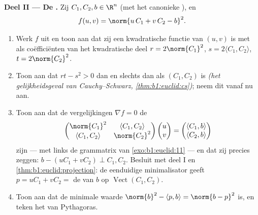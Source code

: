 \begin{problem}
\medskip
\noindent\textbf{Deel II --- De .} Zij $C_1,
C_2, b \in \R^n$ (met het canonieke ), en
\[
f(u, v) = \norm{u\,C_1 + v\,C_2 - b}^2 .
\]
\begin{enumerate}[resume]
  \item Werk $f$ uit en toon aan dat zij een kwadratische functie
        van $(u, v)$ is met als coëfficiënten van het kwadratische
        deel $r = 2\norm{C_1}^2$, $s = 2\langle C_1, C_2\rangle$,
        $t = 2\norm{C_2}^2$.
  \item Toon aan dat $rt - s^2 > 0$ dan en slechts dan als $(C_1,
        C_2)$  is \emph{(het gelijkheidsgeval van
        Cauchy--Schwarz, \cref{thm:b1:euclid:cs})}; neem dit vanaf
        nu aan.
  \item Toon aan dat de  vergelijkingen $\nabla f = 0$ de
        \emph{}
        \[
        \begin{pmatrix}
        \norm{C_1}^2 & \langle C_1, C_2\rangle\\
        \langle C_1, C_2\rangle & \norm{C_2}^2
        \end{pmatrix}
        \begin{pmatrix} u\\ v\end{pmatrix}
        =
        \begin{pmatrix} \langle C_1, b\rangle\\ \langle C_2,
        b\rangle\end{pmatrix}
        \]
        zijn --- met links de grammatrix van
        \cref{exo:b1:euclid:11} --- en dat zij precies zeggen: $b -
        (uC_1 + vC_2) \perp C_1, C_2$. Besluit met deel I en
        \cref{thm:b1:euclid:projection}: de eenduidige
        minimalisator geeft $p = uC_1 + vC_2 = $ de  van $b$ op $\operatorname{Vect}(C_1, C_2)$.
  \item Toon aan dat de minimale waarde $\norm{b}^2 - \langle p,
        b\rangle = \norm{b - p}^2$ is, en teken het  van
        Pythagoras.
\end{enumerate}


\end{problem}
